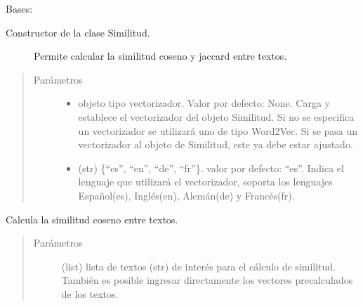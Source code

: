 \documentclass[letterpaper,10pt,openany,spanish]{sphinxmanual}
\begin{document}

\begin{fulllineitems}
\label{\detokenize{funciones/comparacion:comparacion.Similitud}}
Bases: 
\begin{description}
\item[{Constructor de la clase Similitud. }] \leavevmode
Permite calcular la similitud coseno y jaccard entre textos.

\end{description}
\begin{quote}\begin{description}
\item[{Parámetros}] \leavevmode\begin{itemize}
\item {} 
 \textendash{} objeto tipo vectorizador. 
Valor por defecto: None. 
Carga y establece el vectorizador del objeto Similitud. 
Si no se especifica un 
vectorizador se utilizará uno de tipo Word2Vec. Si se pasa un 
vectorizador al objeto de Similitud, este ya debe estar ajustado.

\item {} 
 \textendash{} (str) \{“es”, “en”, “de”, “fr”\}. 
valor por defecto: “es”. Indica el lenguaje que utilizará el 
vectorizador, soporta los lenguajes Español(es), Inglés(en), 
Alemán(de) y Francés(fr).

\end{itemize}

\end{description}\end{quote}

\begin{fulllineitems}
\label{\detokenize{funciones/comparacion:comparacion.Similitud.coseno}}
Calcula la similitud coseno entre textos.
\begin{quote}\begin{description}
\item[{Parámetros}] \leavevmode
{} \textendash{} (list) lista de textos (str) de interés para el 
cálculo de similitud. También es posible ingresar directamente 
los vectores pre\sphinxhyphen{}calculados de los textos.


\end{description}
\end{quote}
\end{fulllineitems}
\end{fulllineitems}
\end{document}
